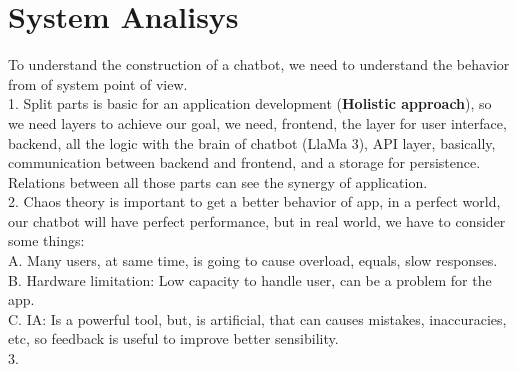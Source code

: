 \documentclass[conference]{IEEEtran}
\begin{document}
	\section{System Analisys}
	To understand the construction of a chatbot, we need to understand the behavior from of system point of view.\\
	
	1. Split parts is basic for an application development (\textbf{Holistic approach}), so we need layers to achieve our goal, we need, frontend, the layer for user interface, backend, all the logic with the brain of chatbot (LlaMa 3), API layer, basically, communication between backend and frontend, and a storage for persistence. \\
	
	Relations between all those parts can see the synergy of application.\\
	
	2. Chaos theory is important to get a better behavior of app, in a perfect world, our chatbot will have perfect performance, but in real world, we have to consider some things:\\
	
		A. Many users, at same time, is going to cause overload, equals, slow responses.\\
		
		B. Hardware limitation: Low capacity to handle user, can be a problem for the app.\\
		
		C. IA: Is a powerful tool, but, is artificial, that can causes mistakes, inaccuracies, etc, so feedback is useful to improve better sensibility. \\
		
	
	3. 
	
	
	\begin{thebibliography}{00}
	\end{thebibliography}
	
	
\end{document}
